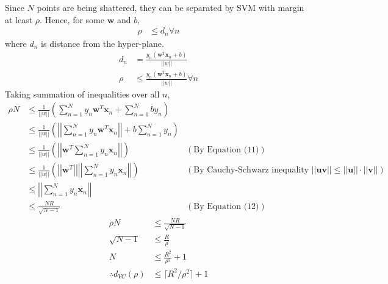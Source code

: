 \documentclass[12pt]{article}
\newcommand{\bd}[1]{\boldsymbol{#1}}
\begin{document}
Since \(N\) points are being shattered, they can be separated by SVM with margin at least \(\rho\).
Hence, for some \(\bd{w}\) and \(b\),
\begin{align*}
    \rho & \leq d_n \forall n
\end{align*}
where \(d_n\) is distance from the hyper-plane.
\begin{align*}
    d_n & = \frac{y_n(\bd{w}^T\bd{x}_n+b)}{||w||} \\
    \rho & \leq \frac{y_n(\bd{w}^T\bd{x}_n+b)}{||w||} \forall n
\end{align*}
Taking summation of inequalities over all \(n\),
\begin{align*}
    \rho N & \leq \frac{1}{||w||}\left(\sum_{n=1}^Ny_n\bd{w}^T\bd{x}_n + \sum_{n=1}^Nby_n\right) \\
    & \leq \frac{1}{||w||}\left(\left|\left|\sum_{n=1}^Ny_n\bd{w}^T\bd{x}_n\right|\right| + b\sum_{n=1}^Ny_n\right) \\
    & \leq \frac{1}{||w||}\left(\left|\left|\bd{w}^T\sum_{n=1}^Ny_n\bd{x}_n\right|\right|\right) & (\text{By Equation (11)})\\
    & \leq \frac{1}{||w||}\left(\left|\left|\bd{w}^T\right|\right|\left|\left|\sum_{n=1}^Ny_n\bd{x}_n\right|\right|\right) & (\text{By Cauchy-Schwarz inequality \(||\bd{uv}|| \leq ||\bd{u}||\cdot||\bd{v}||\)})\\
    & \leq \left|\left|\sum_{n=1}^Ny_n\bd{x}_n\right|\right| \\
    & \leq \frac{NR}{\sqrt{N-1}} & (\text{By Equation (12)})
\end{align*}
\begin{align*}
    \rho N & \leq \frac{NR}{\sqrt{N-1}}\\
    \sqrt{N-1} & \leq \frac{R}{\rho} \\
    N & \leq \frac{R^2}{\rho^2} + 1 \\
    \therefore d_{VC}(\rho) & \leq \lceil R^2/\rho^2 \rceil + 1\\
\end{align*}
\end{document}
